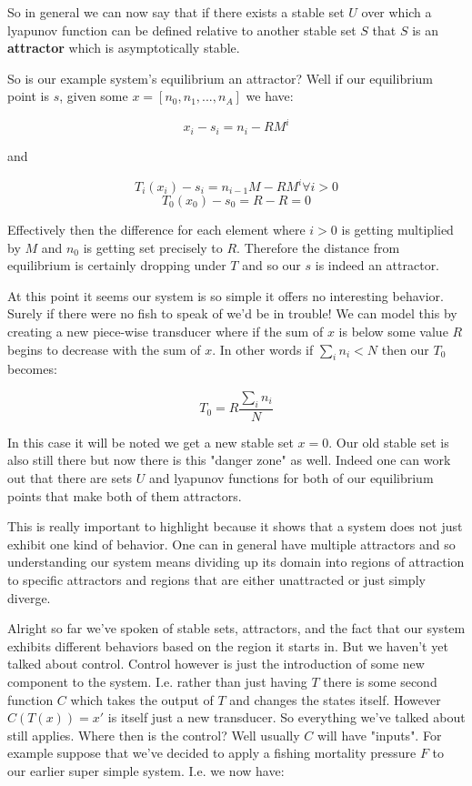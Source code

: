 \documentclass[11pt,a5paper]{article}
\begin{document}
So in general we can now say that if there exists a stable set $U$ over which a lyapunov function can be defined relative to another stable set $S$ that $S$ is an \textbf{attractor} which is asymptotically stable. \newline

So is our example system's equilibrium an attractor? Well if our equilibrium point is $s$, given some $x=[n_0, n_1, ..., n_A]$ we have:

$$x_i-s_i=n_i-RM^i$$

and 

$$T_i(x_i) - s_i = n_{i-1}M-RM^i \forall i>0$$
$$T_0(x_0) - s_0 = R - R = 0$$

Effectively then the difference for each element where $i>0$ is getting multiplied by $M$ and $n_0$ is getting set precisely to $R$. Therefore the distance from equilibrium is certainly dropping under $T$ and so our $s$ is indeed an attractor. \newline

At this point it seems our system is so simple it offers no interesting behavior. Surely if there were no fish to speak of we'd be in trouble! We can model this by creating a new piece-wise transducer where if the sum of $x$ is below some value $R$ begins to decrease with the sum of $x$. In other words if $\sum_i n_i < N$ then our $T_0$ becomes:

$$T_0=R  \frac{\sum_i n_i}{N}$$

In this case it will be noted we get a new stable set $x=0$. Our old stable set is also still there but now there is this "danger zone" as well. Indeed one can work out that there are sets $U$ and lyapunov functions for both of our equilibrium points that make both of them attractors. 

This is really important to highlight because it shows that a system does not just exhibit one kind of behavior. One can in general have multiple attractors and so understanding our system means dividing up its domain into regions of attraction to specific attractors and regions that are either unattracted or just simply diverge. \newline

Alright so far we've spoken of stable sets, attractors, and the fact that our system exhibits different behaviors based on the region it starts in. But we haven't yet talked about control. Control however is just the introduction of some new component to the system. I.e. rather than just having $T$ there is some second function $C$ which takes the output of $T$ and changes the states itself. However $C(T(x))=x'$ is itself just a new transducer. So everything we've talked about still applies. Where then is the control? Well usually $C$ will have "inputs". For example suppose that we've decided to apply a fishing mortality pressure $F$ to our earlier super simple system. I.e. we now have:
\end{document}
